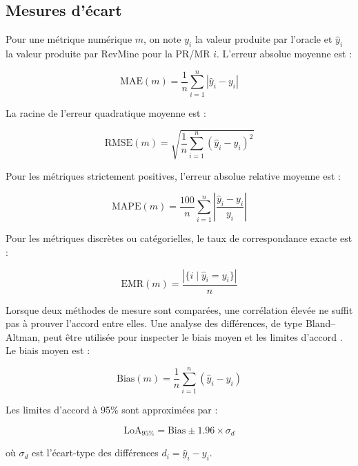\subsection{Mesures d'écart}
\label{subsec:mesures-ecart}

Pour une métrique numérique $m$, on note $y_i$ la valeur produite par l'oracle et $\hat{y}_i$ la valeur produite par RevMine pour la PR/MR $i$. L'erreur absolue moyenne est :

\begin{equation}
\mathrm{MAE}(m) = \frac{1}{n}\sum_{i=1}^{n}|\hat{y}_i-y_i|
\end{equation}

La racine de l'erreur quadratique moyenne est :

\begin{equation}
\mathrm{RMSE}(m) = \sqrt{\frac{1}{n}\sum_{i=1}^{n}(\hat{y}_i-y_i)^2}
\end{equation}

Pour les métriques strictement positives, l'erreur absolue relative moyenne est :

\begin{equation}
\mathrm{MAPE}(m) = \frac{100}{n}\sum_{i=1}^{n}\left|\frac{\hat{y}_i-y_i}{y_i}\right|
\end{equation}

Pour les métriques discrètes ou catégorielles, le taux de correspondance exacte est :

\begin{equation}
\mathrm{EMR}(m) = \frac{|\{i \mid \hat{y}_i=y_i\}|}{n}
\end{equation}

Lorsque deux méthodes de mesure sont comparées, une corrélation élevée ne suffit pas à prouver l'accord entre elles. Une analyse des différences, de type Bland--Altman, peut être utilisée pour inspecter le biais moyen et les limites d'accord \cite{bland1986statistical}. Le biais moyen est :

\begin{equation}
\mathrm{Bias}(m) = \frac{1}{n}\sum_{i=1}^{n}(\hat{y}_i-y_i)
\end{equation}

Les limites d'accord à 95\% sont approximées par :

\begin{equation}
\mathrm{LoA}_{95\%} = \mathrm{Bias} \pm 1.96 \times \sigma_{d}
\end{equation}

où $\sigma_d$ est l'écart-type des différences $d_i=\hat{y}_i-y_i$.

